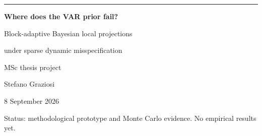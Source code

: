 \documentclass[aspectratio=169,11pt]{beamer}
\begin{document}
{
\begin{frame}[plain]
  \color{WarmWhite}
  \vspace{8mm}
  {\color{Teal}\rule{22mm}{2.6pt}}\par
  \vspace{7mm}
  {\fontsize{36}{41}\selectfont\bfseries
    Where does the VAR prior fail?\par}
  \vspace{4mm}
  {\fontsize{22}{27}\selectfont
    Block-adaptive Bayesian local projections\par
    under sparse dynamic misspecification}
  \vfill
  {\fontsize{15}{19}\selectfont\color{LightGray}
    MSc thesis project\par
    Stefano Graziosi\par
    8 September 2026}
  \vspace{5mm}
  {\fontsize{12}{15}\selectfont\color{LightGray}
    Status: methodological prototype and Monte Carlo evidence. No empirical results yet.}
\end{frame}
}
\end{document}
